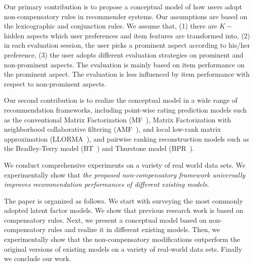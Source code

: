 \documentclass[letterpaper]{article} %
\begin{document}
Our primary contribution is to propose a conceptual model of how users adopt non-compensatory rules in recommender systems. Our assumptions are based on the lexicographic and conjunction rules. We assume that, (1) there are $K-$ hidden aspects which  user preferences and item features are transformed into, (2) in each evaluation session, the user picks a prominent aspect according to his/her preference, (3) the user adopts different evaluation strategies on prominent and non-prominent aspects. The evaluation is mainly based on item performance on the prominent aspect. The evaluation is less influenced by item performance with respect to non-prominent aspects.

Our second contribution is to realize the conceptual model in a wide range of recommendation frameworks, including point-wise rating prediction models such as the conventional Matrix Factorization (MF~\cite{Koren2009Matrix}), Matrix Factorization with neighborhood collaborative filtering (AMF~\cite{Koren2008Factorization}), and local low-rank matrix approximation (LLORMA~\cite{Lee2016LLORMA}), and pairwise ranking reconstruction models such as the Bradley-Terry model (BT~\cite{Hu2016Improved}) and Thurstone model (BPR~\cite{Rendle2009BPR}). 

We conduct comprehensive experiments on a variety of real world data sets. We experimentally show that \emph{ the proposed non-compensatory framework universally improves recommendation performances of different existing models}. 

The paper is organized as follows. We start with surveying the most commonly adopted latent factor models. We show that previous research work is based on compensatory rules. Next, we present a conceptual model based on non-compensatory rules and realize it in different existing models. Then, we experimentally show that the non-compensatory modifications outperform the original versions of existing models on a variety of real-world data sets. Finally we conclude our work.
\end{document}
